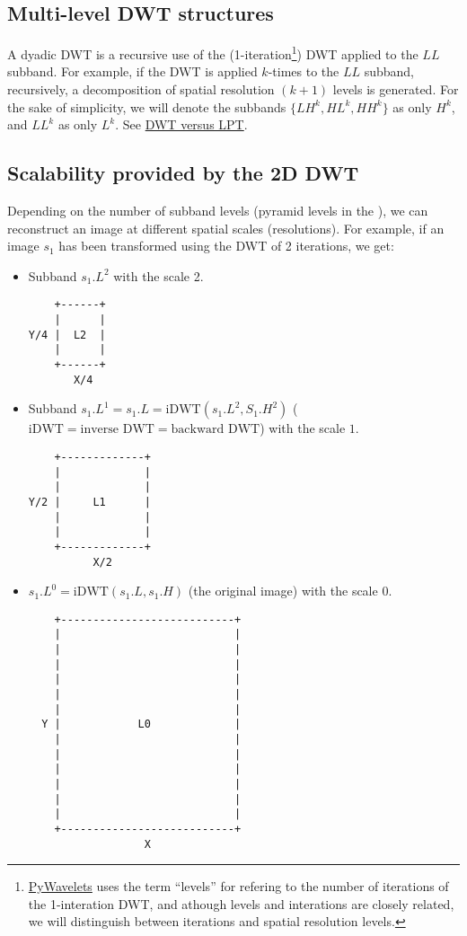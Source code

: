 \subsection{Multi-level DWT structures}
A dyadic DWT is a recursive use of the
(1-iteration\footnote{\href{https://pywavelets.readthedocs.io/en/latest/index.html}{PyWavelets}
  uses the term ``levels'' for refering to the number of iterations of
  the 1-interation DWT, and athough levels and interations are closely
  related, we will distinguish between iterations and spatial
  resolution levels.}) DWT applied to the $LL$ subband. For example,
if the DWT is applied $k$-times to the $LL$ subband, recursively, a
decomposition of spatial resolution $(k+1)$ levels is generated. For
the sake of simplicity, we will denote the subbands $\{LH^k, HL^k,
HH^k\}$ as only $H^k$, and $LL^k$ as only $L^k$. See
\href{https://nbviewer.jupyter.org/github/Sistemas-Multimedia/MCDWT/blob/master/docs/DWT_vs_LPT.ipynb}{DWT
  versus LPT}.

\subsection{Scalability provided by the 2D DWT}
Depending on the number of subband levels (pyramid levels in the
), we can
reconstruct an image at different spatial scales (resolutions). For
example, if an image $s_1$ has been transformed using the DWT of 2
iterations, we get:
\begin{itemize}
\item Subband $s_1.L^2$ with the scale 2.
\begin{verbatim}
    +------+
    |      |
Y/4 |  L2  |
    |      |
    +------+
       X/4
\end{verbatim}
\item Subband $s_1.L^1=s_1.L=\text{iDWT}(s_1.L^2, S_1.H^2)$
  ($\text{iDWT}=\text{inverse DWT}=\text{backward DWT}$) with the
  scale $1$.
\begin{verbatim}
    +-------------+
    |             |
    |             |
Y/2 |     L1      |
    |             | 
    |             |
    +-------------+
          X/2
\end{verbatim}
  
\item $s_1.L^0=\text{iDWT}(s_1.L, s_1.H)$ (the original image) with
  the scale $0$.
\begin{verbatim}
    +---------------------------+
    |                           |
    |                           |
    |                           | 
    |                           |
    |                           |
    |                           |
  Y |            L0             |
    |                           | 
    |                           |
    |                           | 
    |                           | 
    |                           |
    |                           |
    +---------------------------+
                  X
\end{verbatim}
\end{itemize}

